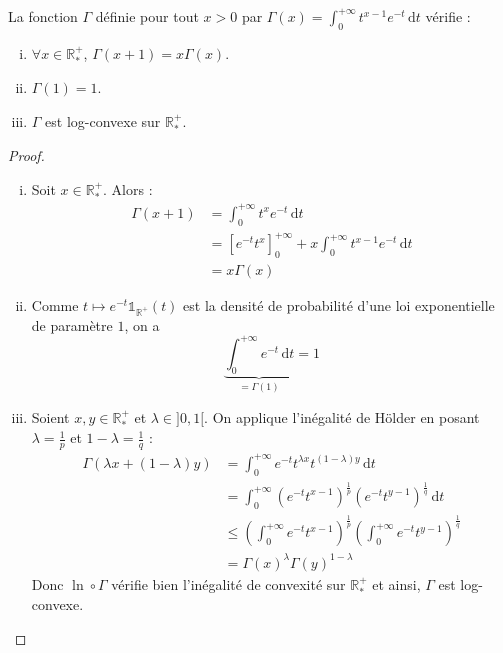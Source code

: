 



	

	\begin{lemma}
		\label{caracterisation-reelle-de-gamma-1}
		La fonction $\Gamma$ définie pour tout $x > 0$ par $\Gamma(x) = \int_0^{+\infty} t^{x-1} e^{-t} \, \mathrm{d}t$ vérifie :
		\begin{enumerate}[(i)]
			\item $\forall x \in \mathbb{R}^+_*$, $\Gamma(x+1) = x\Gamma(x)$.
			\item $\Gamma(1) = 1$.
			\item $\Gamma$ est log-convexe sur $\mathbb{R}^+_*$.
		\end{enumerate}
	\end{lemma}

	\begin{proof}
		\begin{enumerate}[(i)]
			\item Soit $x \in \mathbb{R}^+_*$. Alors :
			\begin{align*}
				\Gamma(x+1) &= \int_0^{+\infty} t^x e^{-t} \, \mathrm{d}t \\
				&= \left[ e^{-t} t^x \right]_0^{+\infty} + x \int_0^{+\infty} t^{x-1} e^{-t} \, \mathrm{d}t \\
				&= x\Gamma(x)
			\end{align*}
			\item Comme $t \mapsto e^{-t} \mathbb{1}_{\mathbb{R}^+}(t)$ est la densité de probabilité d'une loi exponentielle de paramètre $1$, on a
			\[ \underbrace{\int_0^{+\infty} e^{-t} \, \mathrm{d}t}_{= \Gamma(1)} = 1 \]
			\item Soient $x, y \in \mathbb{R}^+_*$ et $\lambda \in ]0, 1[$. On applique l'inégalité de Hölder en posant $\lambda = \frac{1}{p}$ et $1-\lambda = \frac{1}{q}$ :
			\begin{align*}
				\Gamma(\lambda x + (1-\lambda) y) &= \int_0^{+\infty} e^{-t} t^{\lambda x} t^{(1-\lambda)y} \, \mathrm{d}t \\
				&= \int_0^{+\infty} (e^{-t} t^{x-1})^{\frac{1}{p}} (e^{-t} t^{y-1})^{\frac{1}{q}} \, \mathrm{d}t \\
				&\leq \left (\int_0^{+\infty} e^{-t} t^{x-1} \right)^{\frac{1}{p}} \left (\int_0^{+\infty} e^{-t} t^{y-1} \right)^{\frac{1}{q}} \\
				&= \Gamma(x)^\lambda \Gamma(y)^{1-\lambda}
			\end{align*}
			Donc $\ln \circ \Gamma$ vérifie bien l'inégalité de convexité sur $\mathbb{R}^+_*$ et ainsi, $\Gamma$ est log-convexe.
		\end{enumerate}
	\end{proof}


